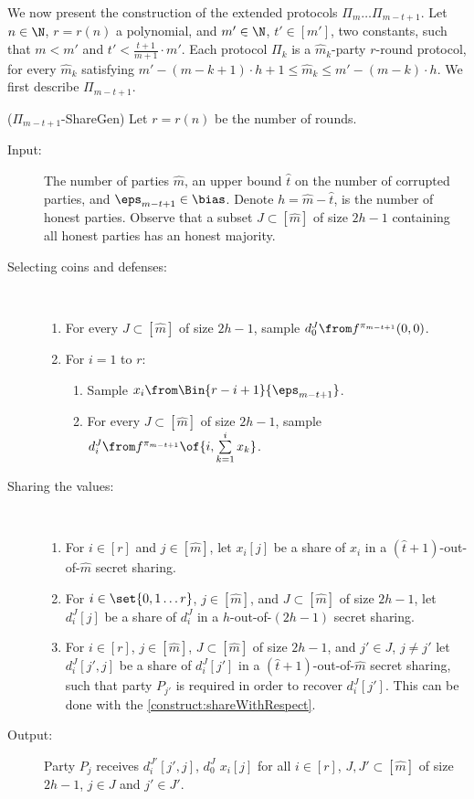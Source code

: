 We now present the construction of the extended protocols $\Pi_m\ldots\Pi_{m-t+1}$. Let $n\in\N$, $r=r(n)$ a polynomial, and $m'\in\N$, $t'\in[m']$, two constants, such that $m<m'$ and $t'<\frac{t+1}{m+1}\cdot m'$. Each protocol $\Pi_k$ is a $\hat{m}_k$-party $r$-round protocol, for every $\hat{m}_k$ satisfying $m'-(m-k+1)\cdot h+1\leq\hat{m}_k\leq m'-(m-k)\cdot h$. We first describe $\Pi_{m-t+1}$.
\begin{algorithm}($\Pi_{m-t+1}$-ShareGen)
Let $r=r(n)$ be the number of rounds.
\begin{description}
	\item[Input:] The number of parties $\hat{m}$, an upper bound $\hat{t}$ on the number of corrupted parties, and $\eps_{m-t+1}\in\bias$.
	Denote $h=\hat{m}-\hat{t}$, is the number of honest parties. Observe that a subset $J\subset[\hat{m}]$ of size $2h-1$ containing all honest parties has an honest majority.
	\item[Selecting coins and defenses:]~
	\begin{enumerate}
		\item For every $J\subset[\hat{m}]$ of size $2h-1$, sample $d^J_0\from f^{\pi_{m-t+1}}(0,0)$.
		\item For $i=1$ to $r$:
		\begin{enumerate}
			\item Sample $x_i\from\Bin{r-i+1}{\eps_{m-t+1}}$.
			\item For every $J\subset[\hat{m}]$ of size $2h-1$, sample $d^J_i\from f^{\pi_{m-t+1}}\of{i,\sum\limits_{k=1}^i x_k}$.
		\end{enumerate}
	\end{enumerate}
	\item[Sharing the values:]~
	\begin{enumerate}
		\item For $i\in[r]$ and $j\in[\hat{m}]$, let $x_i[j]$ be a share of $x_i$ in a $(\hat{t}+1)$-out-of-$\hat{m}$ secret sharing.
		\item For $i\in\set{0,1\ldots r}$, $j\in[\hat{m}]$, and $J\subset[\hat{m}]$ of size $2h-1$, let $d_i^J[j]$ be a share of $d_i^J$ in a $h$-out-of-$(2h-1)$ secret sharing.
		\item For $i\in[r]$, $j\in[\hat{m}]$, $J\subset[\hat{m}]$ of size $2h-1$, and $j'\in J$, $j\ne j'$ let $d_i^J[j',j]$ be a share of $d_i^J[j']$ in a $(\hat{t}+1)$-out-of-$\hat{m}$ secret sharing, such that party $P_{j'}$ is required in order to recover $d_i^J[j']$. This can be done with the \cref{construct:shareWithRespect}.
	\end{enumerate}
	\item[Output:] Party $P_j$ receives $d_i^{J'}[j',j]$, $d_0^J$ $x_i[j]$ for all $i\in[r]$, $J,J'\subset[\hat{m}]$ of size $2h-1$, $j\in J$ and $j'\in J'$. 
\end{description}
\end{algorithm}

